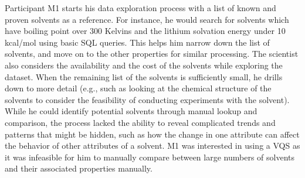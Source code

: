  Participant M1 starts his data exploration process with a list of known and proven solvents as a reference. For instance, he would search for solvents which have boiling point over 300 Kelvins and the lithium solvation energy under 10 kcal/mol using basic SQL queries. This helps him narrow down the list of solvents, and move on to the other properties for similar processing. The scientist also considers the availability and the cost of the solvents while exploring the dataset. When the remaining list of the solvents is sufficiently small, he drills down to more detail (e.g., such as looking at the chemical structure of the solvents to consider the feasibility of conducting experiments with the solvent). While he could identify potential solvents through  manual lookup and comparison,  the process lacked the ability to reveal complicated trends and patterns that might be hidden, such as how the change in one attribute can affect the behavior of other attributes of a solvent. M1 was interested in using a VQS as it was infeasible for him to manually compare between large numbers of solvents and their associated properties manually.
\raggedbottom